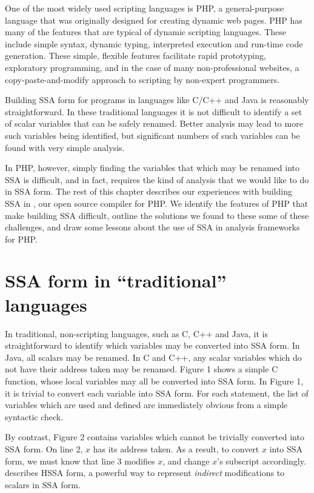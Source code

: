 One of the most widely used scripting languages is PHP, a general-purpose language that was originally designed for creating dynamic web pages.
PHP has many of the features that are typical of dynamic scripting languages.
These include simple syntax, dynamic typing, interpreted execution and run-time code generation.
These simple, flexible features facilitate rapid prototyping, exploratory programming, and in the case of many non-professional websites, a copy-paste-and-modify approach to scripting by non-expert programmers.

Building SSA form for programs in languages like C/C++ and Java is reasonably straightforward.
In these traditional languages it is not difficult to identify a set of scalar variables that can be safely renamed.
Better analysis may lead to more such variables being identified, but significant numbers of such variables can be found with very simple analysis.

In PHP, however, simply finding the variables that which may be renamed into SSA is difficult, and in fact, requires the kind of analysis that we would like to do in SSA form.
The rest of this chapter describes our experiences with building SSA in \phc, our open source compiler for PHP.
We identify the features of PHP that make building SSA difficult, outline the solutions we found to these some of these challenges, and draw some lessons about the use of SSA in analysis frameworks for PHP.



\section{SSA form in ``traditional'' languages}

In traditional, non-scripting languages, such as C, C++ and Java, it is straightforward to identify which variables may be converted into SSA form.
In Java, all scalars may be renamed.
In C and C++, any scalar variables which do not have their address taken may be renamed.
Figure 1 shows a simple C function, whose local variables may all be converted into SSA form.
In Figure 1, it is trivial to convert each variable into SSA form.
For each statement, the list of variables which are used and defined are immediately obvious from a simple syntactic check.

By contrast, Figure 2 contains variables which cannot be trivially converted into SSA form.
On line 2, $x$ has its address taken.
As a result, to convert $x$ into SSA form, we must know that line 3 modifies $x$, and change $x$'s subscript accordingly.
 describes HSSA form, a powerful way to represent \textit{indirect} modifications to scalars in SSA form.

